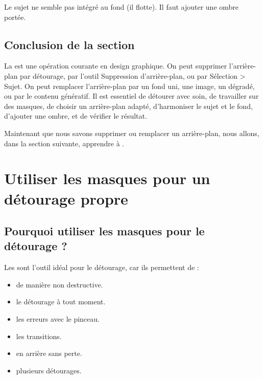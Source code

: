 Le sujet ne semble pas intégré au fond (il flotte). Il faut ajouter une ombre portée.

\subsection*{Conclusion de la section}

La  est une opération courante en design graphique. On peut supprimer l'arrière-plan par détourage, par l'outil Suppression d'arrière-plan, ou par Sélection > Sujet. On peut remplacer l'arrière-plan par un fond uni, une image, un dégradé, ou par le contenu génératif. Il est essentiel de détourer avec soin, de travailler sur des masques, de choisir un arrière-plan adapté, d'harmoniser le sujet et le fond, d'ajouter une ombre, et de vérifier le résultat.

Maintenant que nous savons supprimer ou remplacer un arrière-plan, nous allons, dans la section suivante, apprendre à .

\section{Utiliser les masques pour un détourage propre}

\subsection{Pourquoi utiliser les masques pour le détourage ?}

Les  sont l'outil idéal pour le détourage, car ils permettent de :

\begin{itemize}
    \item {} de manière non destructive.
    \item {} le détourage à tout moment.
    \item {} les erreurs avec le pinceau.
    \item {} les transitions.
    \item {} en arrière sans perte.
    \item {} plusieurs détourages.
\end{itemize}

